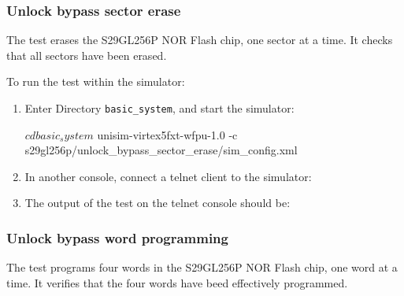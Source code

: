\subsubsection{Unlock bypass sector erase}

The test erases the S29GL256P NOR Flash chip, one sector at a time.
It checks that all sectors have been erased.

\noindent To run the test within the simulator:
\begin{enumerate}
\item Enter Directory \texttt{basic\_system}, and start the simulator:
\begin{script}
$ cd basic_system
$ unisim-virtex5fxt-wfpu-1.0 -c s29gl256p/unlock_bypass_sector_erase/sim_config.xml
\end{script}
\item In another console, connect a telnet client to the simulator:
\item The output of the test on the telnet console should be:

\end{enumerate}

\subsubsection{Unlock bypass word programming}

The test programs four words in the S29GL256P NOR Flash chip, one word at a time.
It verifies that the four words have beed effectively programmed.

